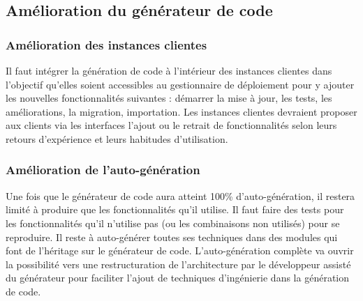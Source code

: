 \subsection{Amélioration du générateur de code}

\subsubsection{Amélioration des instances clientes}

Il faut intégrer la génération de code à l’intérieur des instances clientes dans l’objectif qu’elles soient accessibles au gestionnaire de déploiement pour y ajouter les nouvelles fonctionnalités suivantes : démarrer la mise à jour, les tests, les améliorations, la migration, importation. Les instances clientes devraient proposer aux clients via les interfaces l'ajout ou le retrait de fonctionnalités selon leurs retours d'expérience et leurs habitudes d'utilisation.




\subsubsection{Amélioration de l'auto-génération}

Une fois que le générateur de code aura atteint 100\% d’auto-génération, il restera limité à produire que les fonctionnalités qu’il utilise. Il faut faire des tests pour les fonctionnalités qu’il n’utilise pas (ou les combinaisons non utilisés) pour se reproduire. Il reste à auto-générer toutes ses techniques dans des modules qui font de l'héritage sur le générateur de code. L'auto-génération complète va ouvrir la possibilité vers une restructuration de l'architecture par le développeur assisté du générateur pour faciliter l'ajout de techniques d'ingénierie dans la génération de code.


